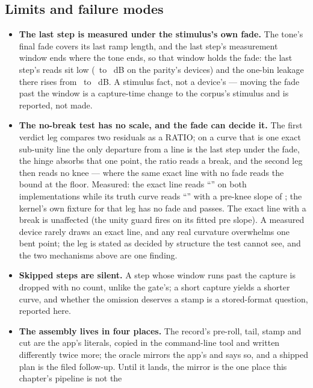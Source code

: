 \documentclass[11pt,a4paper]{article}
\begin{document}
\subsection{Limits and failure modes}
\label{sec:compression-limits}
{\sloppy
\begin{itemize}
  \item \textbf{The last step is measured under the stimulus's own fade.}
  The tone's final fade covers its last ramp length, and the last step's
  measurement window ends where the tone ends, so that window holds the
  fade: the last step's reads sit low (\cparityWorstFade\ to
  \cparityLeastFade\ dB on the parity's devices) and the one-bin leakage
  there rises from \cparityLeakageOne\ to \cparityFadeLeakageOne\ dB. A
  stimulus fact, not a device's --- moving the fade past the window is a
  capture-time change to the corpus's stimulus and is reported, not made.
  \item \textbf{The no-break test has no scale, and the fade can decide
  it.} The first verdict leg compares two residuals as a RATIO; on a
  curve that is one exact sub-unity line the only departure from a line
  is the last step under the fade, the hinge absorbs that one point, the
  ratio reads a break, and the second leg then reads no knee --- where the
  same exact line with no fade reads the bound at the floor. Measured:
  the exact line reads ``\cparityLineMeasuredKnee'' on both
  implementations while its truth curve reads ``\cparityLineTruthKnee''
  with a pre-knee slope of \cparityLineTruthPreSlope; the kernel's own
  fixture for that leg has no fade and passes. The exact line with a break
  is unaffected (the unity guard fires on its fitted pre slope). A
  measured device rarely draws an exact line, and any real curvature
  overwhelms one bent point; the leg is stated as decided by structure the
  test cannot see, and the two mechanisms above are one finding.
  \item \textbf{Skipped steps are silent.} A step whose window runs past
  the capture is dropped with no count, unlike the gate's; a short
  capture yields a shorter curve, and whether the omission deserves a
  stamp is a stored-format question, reported here.
  \item \textbf{The assembly lives in four places.} The record's
  pre-roll, tail, stamp and cut are the app's literals, copied in the
  command-line tool and written differently twice more; the oracle mirrors
  the app's and says so, and a shipped plan is the filed follow-up. Until
  it lands, the mirror is the one place this chapter's pipeline is not the

\end{itemize}}
\end{document}
